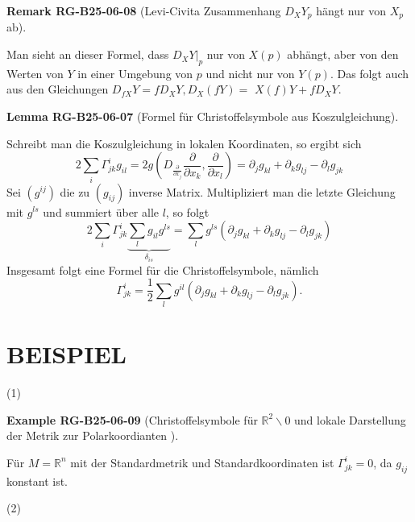 \documentclass[10pt, letterpaper]{article}
\newcommand{\R}{\mathbb{R}}
\newcommand{\CustomHeading}[3]{%
  \par\medskip\noindent%
  \textbf{#1 #2} \textnormal{(#3)}.\enskip%
}
\newenvironment{LEM}[2]{\begin{unitbox}\CustomHeading{Lemma}{#1}{#2}}{\end{unitbox}}
\newenvironment{REM}[2]{\begin{unitbox}\CustomHeading{Remark}{#1}{#2}}{\end{unitbox}}
\newenvironment{EXA}[2]{\begin{unitbox}\CustomHeading{Example}{#1}{#2}}{\end{unitbox}}
\begin{document}
\begin{REM}{RG-B25-06-08}{Levi-Civita Zusammenhang $D_XY_p$ hängt nur von $X_p$ ab}
Man sieht an dieser Formel, dass $\left.D_{X} Y\right|_{p}$ nur von $X(p)$ abhängt, aber von den Werten von $Y$ in einer Umgebung von $p$ und nicht nur von $Y(p)$. Das folgt auch aus den Gleichungen $D_{f X} Y=f D_{X} Y, D_{X}(f Y)=$ $X(f) Y+f D_{X} Y$.
\end{REM}



\begin{LEM}{RG-B25-06-07}{Formel für Christoffelsymbole aus Koszulgleichung}
Schreibt man die Koszulgleichung in lokalen Koordinaten, so ergibt sich
$$
2 \sum_{i} \Gamma_{j k}^{i} g_{i l}=2 g\left(D_{\frac{\partial}{\partial x_{j}}} \frac{\partial}{\partial x_{k}}, \frac{\partial}{\partial x_{l}}\right)=\partial_{j} g_{k l}+\partial_{k} g_{l j}-\partial_{l} g_{j k}
$$
Sei $\left(g^{i j}\right)$ die zu $\left(g_{i j}\right)$ inverse Matrix. Multipliziert man die letzte Gleichung mit $g^{l s}$ und summiert über alle $l$, so folgt
$$
2 \sum_{i} \Gamma_{j k}^{i} \underbrace{\sum_{l} g_{i l} g^{l s}}_{\delta_{i s}}=\sum_{l} g^{l s}\left(\partial_{j} g_{k l}+\partial_{k} g_{l j}-\partial_{l} g_{j k}\right)
$$
Insgesamt folgt eine Formel für die Christoffelsymbole, nämlich
$$
\Gamma_{j k}^{i}=\frac{1}{2} \sum_{l} g^{i l}\left(\partial_{j} g_{k l}+\partial_{k} g_{l j}-\partial_{l} g_{j k}\right) .
$$
\end{LEM}


\section*{BEISPIEL}


(1) 


\begin{EXA}{RG-B25-06-09}{Christoffelsymbole für $\R^2\backslash 0$ und lokale Darstellung der Metrik zur Polarkoordianten }
Für $M=\mathbb{R}^{n}$ mit der Standardmetrik und Standardkoordinaten ist $\Gamma_{j k}^{i}=0$, da $g_{i j}$ konstant ist.
\end{EXA}


(2) 
\end{document}
